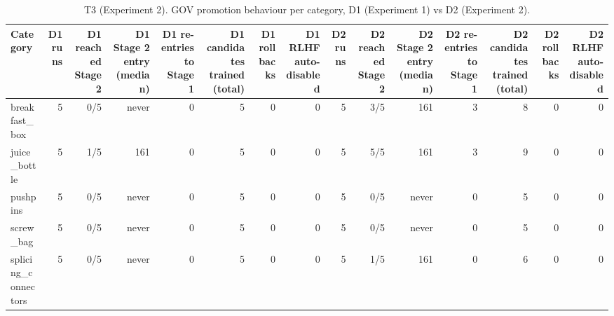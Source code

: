 \begin{table}[t]\centering\small
\caption{T3 (Experiment 2). GOV promotion behaviour per category, D1 (Experiment 1) vs D2 (Experiment 2).}
\label{tab:T3_promotion_exp1_vs_exp2}
\begin{tabular}{lrrrrrrrrrrrrrr}\hline
Category & D1 runs & D1 reached Stage 2 & D1 Stage 2 entry (median) & D1 re-entries to Stage 1 & D1 candidates trained (total) & D1 rollbacks & D1 RLHF auto-disabled & D2 runs & D2 reached Stage 2 & D2 Stage 2 entry (median) & D2 re-entries to Stage 1 & D2 candidates trained (total) & D2 rollbacks & D2 RLHF auto-disabled \\ \hline
breakfast\_box & 5 & 0/5 & never & 0 & 5 & 0 & 0 & 5 & 3/5 & 161 & 3 & 8 & 0 & 0 \\
juice\_bottle & 5 & 1/5 & 161 & 0 & 5 & 0 & 0 & 5 & 5/5 & 161 & 3 & 9 & 0 & 0 \\
pushpins & 5 & 0/5 & never & 0 & 5 & 0 & 0 & 5 & 0/5 & never & 0 & 5 & 0 & 0 \\
screw\_bag & 5 & 0/5 & never & 0 & 5 & 0 & 0 & 5 & 0/5 & never & 0 & 5 & 0 & 0 \\
splicing\_connectors & 5 & 0/5 & never & 0 & 5 & 0 & 0 & 5 & 1/5 & 161 & 0 & 6 & 0 & 0 \\
\hline\end{tabular}
\end{table}
